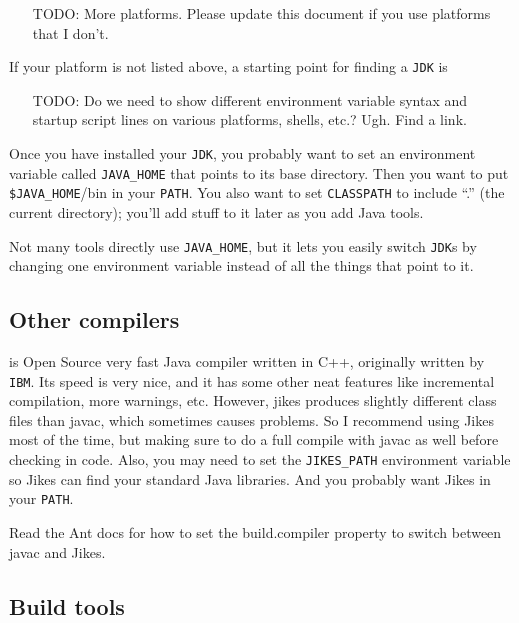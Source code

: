 \documentclass{article}
\begin{document}
\begin{itemize}
\item[TODO:] More platforms. Please update this document if you use
platforms that I don't.
\end{itemize}

If your platform is not listed above, a starting point for finding a
\texttt{JDK} is 

\begin{itemize}
\item[TODO:] Do we need to show different environment variable syntax and
startup script lines on various platforms, shells, etc.? Ugh. Find a link.
\end{itemize}

Once you have installed your \texttt{JDK}, you probably want to set an
environment variable called \texttt{JAVA\_HOME} that points to its base
directory. Then you want to put \texttt{\$JAVA\_HOME}/bin in your
\texttt{PATH}. You also want to set \texttt{CLASSPATH} to include ``.''
(the current directory); you'll add stuff to it later as you add Java tools.

Not many tools directly use \texttt{JAVA\_HOME}, but it lets you easily
switch \texttt{JDK}s by changing one environment variable instead of all
the things that point to it.

\subsection{Other compilers}

 is Open Source very fast Java compiler
written in C++, originally
written by \texttt{IBM}. Its speed is very nice, and it has some other neat 
features like incremental compilation, more warnings, etc. However, 
jikes produces slightly different class files than javac, which 
sometimes causes problems. So I recommend using Jikes most of the time,
but making sure to do a full compile with javac as well before checking
in code.
Also, you may need to set the \texttt{JIKES\_PATH} environment variable so
Jikes can find your standard Java libraries. And you probably want Jikes in
your \texttt{PATH}.

Read the Ant docs for how to set the build.compiler property to 
switch between javac and Jikes.

\subsection{Build tools}
\end{document}
